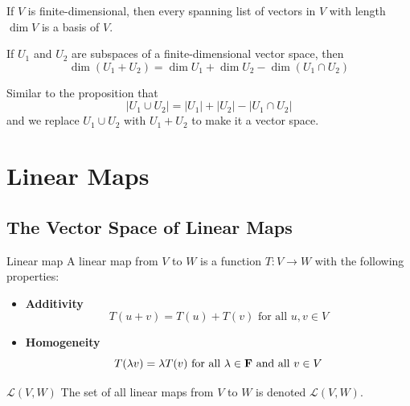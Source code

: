 \documentclass[12pt,a4paper]{article}
\begin{document}
    \begin{prop}
        If $V$ is finite-dimensional, then every spanning list of vectors in $V$ with length $\dim V$ is a basis of $V$.
    \end{prop}
    \hfill

    \begin{prop}
        If $U_1$ and $U_2$ are subspaces of a finite-dimensional vector space, then
        $$
        \dim(U_1+U_2)=\dim{U_1}+\dim{U_2}-\dim(U_1\cap{U_2})
        $$
    \end{prop}
    \begin{remark}
        Similar to the proposition that
        $$
        |U_1\cup U_2|=|U_1|+|U_2|-|U_1\cap{U_2}|
        $$and we replace $U_1\cup U_2$ with $U_1+U_2$ to make it a vector space.
    \end{remark}
    \hfill
    
    \section{Linear Maps}
    \subsection{The Vector Space of Linear Maps}
    \begin{defi}{Linear map}
        A linear map from $V$ to $W$ is a function $T:V\to{W}$ with the following properties:
        \begin{itemize}
            \item \textbf{Additivity}
            $$
            T(u+v)=T(u)+T(v) \text{ for all }u,v\in V
            $$
            \item \textbf{Homogeneity}
            $$
            T(\lambda v)=\lambda T(v) \text{ for all }\lambda\in\mathbf{F}\text{ and all }v\in V 
            $$
        \end{itemize}
    \end{defi}
    \begin{notation}{$\mathcal{L}(V,W)$}
        The set of all linear maps from $V$ to $W$ is denoted $\mathcal{L}(V,W)$.
    \end{notation}
    \hfill
\end{document}
